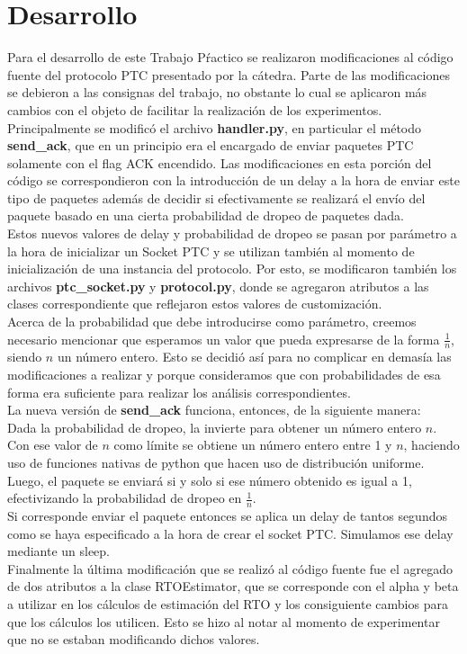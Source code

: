\section{Desarrollo}

\indent \indent Para el desarrollo de este Trabajo Pŕactico se realizaron modificaciones al código fuente del protocolo PTC presentado por la cátedra. Parte de las modificaciones se debieron a las consignas del trabajo, no obstante lo cual se aplicaron más cambios con el objeto de facilitar la realización de los experimentos.\\
\indent Principalmente se modificó el archivo \textbf{handler.py}, en particular el método \textbf{send\_ack}, que en un principio era el encargado de enviar paquetes PTC solamente con el flag ACK encendido. Las modificaciones en esta porción del código se correspondieron con la introducción de un delay a la hora de enviar este tipo de paquetes además de decidir si efectivamente se realizará el envío del paquete basado en una cierta probabilidad de dropeo de paquetes dada.\\
\indent Estos nuevos  valores de delay y probabilidad de dropeo se pasan por parámetro a la hora de inicializar un Socket PTC y se utilizan también al momento de inicialización de una instancia del protocolo. Por esto, se modificaron también los archivos \textbf{ptc\_socket.py} y \textbf{protocol.py}, donde se agregaron atributos a las clases correspondiente que reflejaron estos valores de customización.\\
\indent Acerca de la probabilidad que debe introducirse como parámetro, creemos necesario mencionar que esperamos un valor que pueda expresarse de la forma $\frac{1}{n}$, siendo $n$ un número entero. Esto se decidió así para no complicar en demasía las modificaciones a realizar y porque consideramos que con probabilidades de esa forma era suficiente para realizar los análisis correspondientes.\\
\indent La nueva versión de \textbf{send\_ack} funciona, entonces, de la siguiente manera:\\
\indent Dada la probabilidad de dropeo, la invierte para obtener un número entero $n$. Con ese valor de $n$ como límite se obtiene un número entero entre 1 y $n$, haciendo uso de funciones nativas de python que hacen uso de distribución uniforme. Luego, el paquete se enviará si y solo si ese número obtenido es igual a 1, efectivizando la probabilidad de dropeo en $\frac{1}{n}$.\\
\indent Si corresponde enviar el paquete entonces se aplica un delay de tantos segundos como se haya especificado a la hora de crear el socket PTC. Simulamos ese delay mediante un sleep.\\
\indent Finalmente la última modificación que se realizó al código fuente fue el agregado de dos atributos a la clase RTOEstimator, que se corresponde con el alpha y beta a utilizar en los cálculos de estimación del RTO y los consiguiente cambios para que los cálculos los utilicen. Esto se hizo al notar al momento de experimentar que no se estaban modificando dichos valores.\\